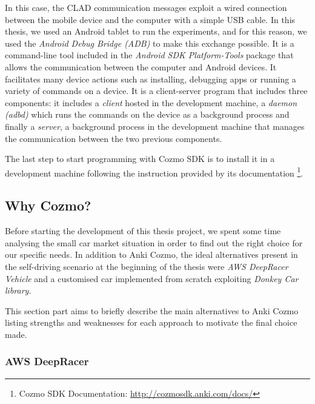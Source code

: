 In this case, the CLAD communication messages exploit a wired connection between the mobile device and the computer with a simple USB cable.  In this thesis, we used an Android tablet to run the experiments, and for this reason, we used the \textit{Android Debug Bridge (ADB)} to make this exchange possible.
It is a command-line tool included in the \textit{Android SDK Platform-Tools} package that allows the communication between the computer and Android devices. It facilitates many device actions such as installing, debugging apps or running a variety of commands on a device. It is a client-server program that includes three components: it includes a \textit{client} hosted in the development machine, a \textit{daemon (adbd)} which runs the commands on the device as a background process and finally a \textit{server}, a background process in the development machine that manages the communication between the two previous components.

The last step to start programming with Cozmo SDK is to install it in a development machine following the instruction provided by its documentation \footnote{Cozmo SDK Documentation: \href{http://cozmosdk.anki.com/docs/index.html}{http://cozmosdk.anki.com/docs/}}.


\subsection{Why Cozmo?}

Before starting the development of this thesis project, we spent some time analysing the small car market situation in order to find out the right choice for our specific needs. In addition to Anki Cozmo, the ideal alternatives present in the self-driving scenario at the beginning of the thesis were \textit{AWS DeepRacer Vehicle} and a customised car implemented from scratch exploiting \textit{Donkey \textregistered Car library}.

This section part aims to briefly describe the main alternatives to Anki Cozmo listing strengths and weaknesses for each approach to motivate the final choice made.

\subsubsection{AWS DeepRacer}

